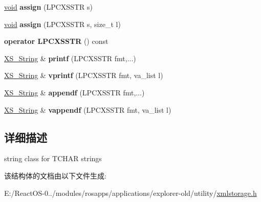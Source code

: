 \begin{DoxyCompactItemize}
\hyperlink{interfacevoid}{void} {\bfseries assign} (L\+P\+C\+X\+S\+S\+TR s)
\item 
\mbox{\label{struct_x_m_l_storage_1_1_x_s___string_a0c2eef84fdc186e353d2626ce1b48694}} 
\hyperlink{interfacevoid}{void} {\bfseries assign} (L\+P\+C\+X\+S\+S\+TR s, size\+\_\+t l)
\item 
\mbox{\label{struct_x_m_l_storage_1_1_x_s___string_a8c9fc4b17f2235cecc06f6a32d8d3951}} 
{\bfseries operator L\+P\+C\+X\+S\+S\+TR} () const
\item 
\mbox{\label{struct_x_m_l_storage_1_1_x_s___string_a6ba0686b6dbd8a799916aec72ab5edac}} 
\hyperlink{struct_x_m_l_storage_1_1_x_s___string}{X\+S\+\_\+\+String} \& {\bfseries printf} (L\+P\+C\+X\+S\+S\+TR fmt,...)
\item 
\mbox{\label{struct_x_m_l_storage_1_1_x_s___string_a09bb52f9675e85072e3793380e33d92c}} 
\hyperlink{struct_x_m_l_storage_1_1_x_s___string}{X\+S\+\_\+\+String} \& {\bfseries vprintf} (L\+P\+C\+X\+S\+S\+TR fmt, va\+\_\+list l)
\item 
\mbox{\label{struct_x_m_l_storage_1_1_x_s___string_ab8113ae0d1331525f1e6cc79601c19db}} 
\hyperlink{struct_x_m_l_storage_1_1_x_s___string}{X\+S\+\_\+\+String} \& {\bfseries appendf} (L\+P\+C\+X\+S\+S\+TR fmt,...)
\item 
\mbox{\label{struct_x_m_l_storage_1_1_x_s___string_a5860c0632e7245395af95ff4cde64795}} 
\hyperlink{struct_x_m_l_storage_1_1_x_s___string}{X\+S\+\_\+\+String} \& {\bfseries vappendf} (L\+P\+C\+X\+S\+S\+TR fmt, va\+\_\+list l)
\end{DoxyCompactItemize}


\subsection{详细描述}
string class for T\+C\+H\+AR strings 

该结构体的文档由以下文件生成\+:\begin{DoxyCompactItemize}
\item 
E\+:/\+React\+O\+S-\/0../modules/rosapps/applications/explorer-\/old/utility/\hyperlink{xmlstorage_8h}{xmlstorage.\+h}\end{DoxyCompactItemize}
